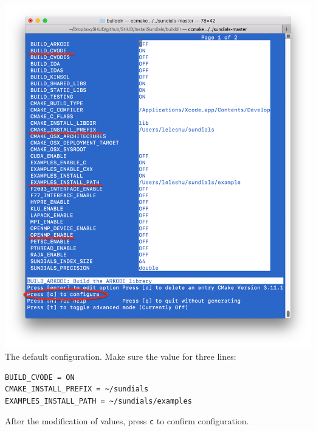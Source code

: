 \documentclass[
]{scrbook}
\begin{document}
\includegraphics{Fig/ccmake/2.png}
The default configuration. Make sure the value for three lines:

\begin{verbatim}
BUILD_CVODE = ON
CMAKE_INSTALL_PREFIX = ~/sundials
EXAMPLES_INSTALL_PATH = ~/sundials/examples
\end{verbatim}

After the modification of values, press \texttt{c} to confirm configuration.
\end{document}
